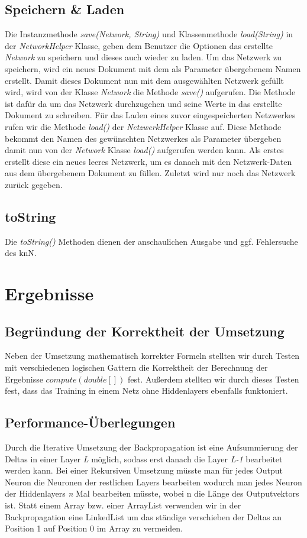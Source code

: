 \documentclass[paper=A4,pagesize=auto,12pt,headinclude=true,footinclude=true,BCOR=0mm,DIV=calc]{scrartcl}
\begin{document}
	
	\subsection{Speichern \& Laden}
	Die Instanzmethode \textit{save(Network, String)} und Klassenmethode \textit{load(String)} in der \textit{NetworkHelper} Klasse, geben dem Benutzer die Optionen das erstellte \textit{Network} zu speichern und dieses auch wieder zu laden.
	Um das Netzwerk zu speichern, wird ein neues Dokument mit dem als Parameter übergebenem Namen erstellt. Damit dieses Dokument nun mit dem ausgewählten Netzwerk gefüllt wird, wird von der Klasse \textit{Network} die Methode \textit{save()} aufgerufen. Die Methode ist dafür da um das Netzwerk durchzugehen und seine Werte in das
	erstellte Dokument zu schreiben. Für das Laden eines zuvor eingespeicherten Netzwerkes rufen wir die Methode \textit{load()} der \textit{NetzwerkHelper} Klasse auf. Diese Methode bekommt den Namen des gewünschten Netzwerkes als Parameter übergeben damit nun von der \textit{Network} Klasse \textit{load()} aufgerufen werden kann. Als erstes erstellt diese ein neues leeres Netzwerk, um es danach mit den Netzwerk-Daten aus dem übergebenem Dokument zu füllen. Zuletzt wird nur noch das Netzwerk zurück gegeben.
	
	
	\subsection{toString}
	Die \textit{toString()} Methoden dienen der anschaulichen Ausgabe und ggf. Fehlersuche des knN. 
	
	\newpage
	
	\section{Ergebnisse}
	
	\subsection{Begründung der Korrektheit der Umsetzung}
	Neben der Umsetzung mathematisch korrekter Formeln stellten wir durch Testen mit verschiedenen logischen Gattern die Korrektheit der Berechnung der Ergebnisse \(compute (double[])\) fest.
	Außerdem stellten wir durch dieses Testen fest, dass das Training in einem Netz ohne Hiddenlayers ebenfalls funktoniert.
	
	\subsection{Performance-Überlegungen}
	Durch die Iterative Umsetzung der Backpropagation ist eine Aufsummierung der Deltas in einer Layer \textit{L} möglich, sodass erst danach die Layer \textit{L-1} bearbeitet werden kann.
	Bei einer Rekursiven Umsetzung müsste man für jedes Output Neuron die Neuronen der restlichen Layers bearbeiten wodurch man jedes Neuron der Hiddenlayers \textit{n} Mal bearbeiten müsste, wobei n die Länge des Outputvektors ist.
	Statt einem Array bzw. einer ArrayList verwenden wir in der Backpropagation eine LinkedList um das ständige verschieben der Deltas an Position 1 auf Position 0 im Array zu vermeiden.
	
\end{document}
